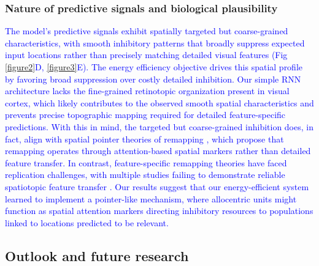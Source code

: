 \documentclass[10pt,letterpaper]{article}
\begin{document}
\subsubsection{Nature of predictive signals and biological plausibility}
\textcolor{blue}{The model's predictive signals exhibit spatially targeted but coarse-grained characteristics, with smooth inhibitory patterns that broadly suppress expected input locations rather than precisely matching detailed visual features (Fig \ref{figure2}D, \ref{figure3}E). The energy efficiency objective drives this spatial profile by favoring broad suppression over costly detailed inhibition. Our simple RNN architecture lacks the fine-grained retinotopic organization present in visual cortex, which likely contributes to the observed smooth spatial characteristics and prevents precise topographic mapping required for detailed feature-specific predictions.
With this in mind, the targeted but coarse-grained inhibition does, in fact, align with spatial pointer theories of remapping \citep{cavanagh_visual_2010, rolfs_predictive_2011, knapen_oculomotor_2016}, which propose that remapping operates through attention-based spatial markers rather than detailed feature transfer. In contrast, feature-specific remapping theories \citep{melcher_predictive_2007} have faced replication challenges, with multiple studies failing to demonstrate reliable spatiotopic feature transfer \citep{knapen_reference_2010, mathot_reinvestigation_2013, morgan_bias-free_2014}. Our results suggest that our energy-efficient system learned to implement a pointer-like mechanism, where allocentric units might function as spatial attention markers directing inhibitory resources to populations linked to locations predicted to be relevant.}

\subsection{Outlook and future research}
\end{document}
